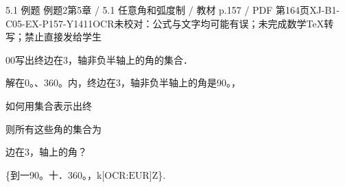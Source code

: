 \begin{bankitem}{5.1 例题 例题2}{第5章 / 5.1 任意角和弧度制 / 教材 p.157 / PDF 第164页}{XJ-B1-C05-EX-P157-Y1411}{OCR未校对：公式与文字均可能有误；未完成数学TeX转写；禁止直接发给学生}
\begin{ocrdraft}
\par
00写出终边在3，轴非负半轴上的角的集合．
\par
解在0。、360。内，终边在3，轴非负半轴上的角是90。，
\par
如何用集合表示出终
\par
则所有这些角的集合为
\par
边在3，轴上的角？
\par
\{到一90。十．360。，k\ensuremath{\text{[OCR:EUR]}}Z\}.
\end{ocrdraft}
\end{bankitem}
